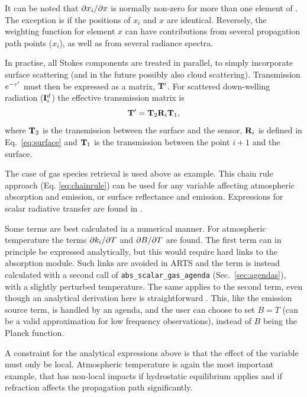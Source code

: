 It can be noted that $\partial x_i/\partial x$ is normally non-zero for more than
one element of \SttVct. The exception is if the positions of $x_i$ and $x$ are
identical. Reversely, the weighting function for element $x$ can have
contributions from several propagation path points ($x_i$), as well as from
several radiance spectra.

In practise, all Stokes components are treated in parallel, to simply
incorporate surface scattering (and in the future possibly also cloud
scattering). Transmission $e^{-\tau'}$ must then be expressed as a matrix,
$\mathbf{T}'$. For scattered down-welling radiation (${\bf I}^d_i$) the
effective transmission matrix is
\begin{equation}
  \mathbf{T}' = \mathbf{T}_2\mathbf{R}_i\mathbf{T}_1,
\end{equation}
where $\mathbf{T}_2$ is the transmission between the surface and the sensor,
$\mathbf{R}_i$ is defined in Eq.~\ref{eq:surface} and $\mathbf{T}_1$ is the
transmission between the point $i+1$ and the surface.

The case of gas species retrieval is used above as example. This chain rule
approach (Eq. \ref{eq:chainrule}) can be used for any variable affecting
atmospheric absorption and emission, or surface reflectance and emission.
Expressions for scalar radiative transfer are found in \cite{buehler:artst:05}.

Some terms are best calculated in a numerical manner. For atmospheric
temperature the terms $\partial k_i/\partial T$ and $\partial B/\partial T$ are found.
The first term can in principle be expressed analytically, but this would
require hard links to the absorption module. Such links are avoided in ARTS
and the term is instead calculated with a second call of
\texttt{abs\_scalar\_gas\_agenda} (Sec.~\ref{sec:agendas}), with a slightly
perturbed temperature. The same applies to the second term, even though an
analytical derivation here is straightforward \cite{eriksson:studi:02}. This, like the emission source term, is handled by an agenda, and the user can choose to set $B=T$ (can be a valid approximation for low frequency
observations), instead of $B$ being the Planck function.

A constraint for the analytical expressions above is that the effect of the
variable must only be local. Atmospheric temperature is again the most important
example, that has non-local impacts if hydrostatic equilibrium applies and if
refraction affects the propagation path significantly.


